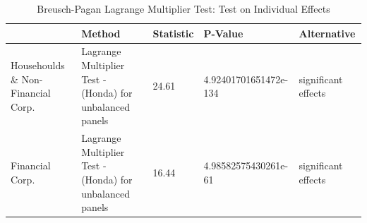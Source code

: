 \begin{table}[ht]
\centering
\caption{Breusch-Pagan Lagrange Multiplier Test: Test on Individual Effects} 
\begingroup\small
\begin{tabular}{lllll}
  \toprule
 & Method & Statistic & P-Value & Alternative \\ 
  \midrule
Househoulds \& Non-Financial Corp. & Lagrange Multiplier Test -  (Honda) for unbalanced panels & 24.61 & 4.92401701651472e-134 & significant effects \\ 
  Financial Corp. & Lagrange Multiplier Test -  (Honda) for unbalanced panels & 16.44 & 4.98582575430261e-61 & significant effects \\ 
   \bottomrule
\end{tabular}
\endgroup
\end{table}
